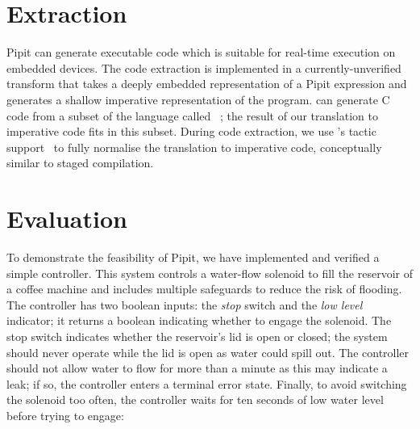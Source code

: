 \documentclass[sigplan,screen, review]{acmart}
\begin{document}
\section{Extraction}
\label{s:extraction}

Pipit can generate executable code which is suitable for real-time execution on embedded devices.
The code extraction is implemented in a currently-unverified transform that takes a deeply embedded representation of a Pipit expression and generates a shallow imperative representation of the program.
\fstar{} can generate C code from a subset of the language called \lowstar{}~\cite{protzenko2017verified}; the result of our translation to imperative code fits in this subset.
During code extraction, we use \fstar{}'s tactic support~\cite{martinez2019meta} to fully normalise the translation to imperative code, conceptually similar to staged compilation.






\section{Evaluation}
\label{s:coffee-machine}

To demonstrate the feasibility of Pipit, we have implemented and verified a simple controller.
This system controls a water-flow solenoid to fill the reservoir of a coffee machine and includes multiple safeguards to reduce the risk of flooding.
The controller has two boolean inputs: the \emph{stop} switch and the \emph{low level} indicator; it returns a boolean indicating whether to engage the solenoid.
The stop switch indicates whether the reservoir's lid is open or closed; the system should never operate while the lid is open as water could spill out.
The controller should not allow water to flow for more than a minute as this may indicate a leak; if so, the controller enters a terminal error state.
Finally, to avoid switching the solenoid too often, the controller waits for ten seconds of low water level before trying to engage:
\end{document}
